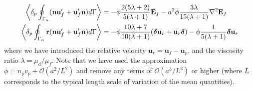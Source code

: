 \begin{align}
    \pSavg{ (\textbf{n} \textbf{u}_f' + \textbf{u}_f' \textbf{n})}
    &=
    -  \phi \frac{2(5\lambda +2)}{5(\lambda+1)}\textbf{E}_f
    -  a^2 \phi \frac{3\lambda}{15(\lambda+1)}\grad^2  \textbf{E}_f
    \\
    \pSavg{ \textbf{r}(\textbf{n} \textbf{u}_f' + \textbf{u}_f' \textbf{n})}
    &=
    -\phi \frac{10\lambda +7}{10(\lambda+1)}
    (\bm\delta \textbf{u}_r + \textbf{u}_r \bm\delta)
    - \phi  \frac{1}{5(\lambda+1)}\bm\delta \textbf{u}_r
    \label{eq:secondUN}
\end{align}
where we have introduced the relative velocity $\textbf{u}_r = \textbf{u}_f - \textbf{u}_p$, and the viscosity ratio $\lambda = \mu_d/\mu_f$. 
Note that we have used the approximation $\phi=n_pv_p + \mathcal{O}(a^2/L^2)$ and remove any terms of $\mathcal{O}(a^3/L^3)$ or higher (where $L$ corresponds to the typical length  scale of variation of the mean quantities). 


